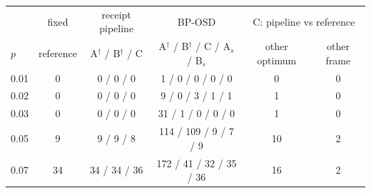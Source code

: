 \begin{tabular}{@{}lccccc@{}}
\toprule
 & fixed & receipt pipeline & BP-OSD & \multicolumn{2}{c}{C: pipeline vs reference} \\
$p$ & reference & A$^\dagger$ / B$^\dagger$ / C & A$^\dagger$ / B$^\dagger$ / C / A$_s$ / B$_s$ & other optimum & other frame \\
\midrule
0.01 & 0 & 0 / 0 / 0 & 1 / 0 / 0 / 0 / 0 & 0 & 0 \\
0.02 & 0 & 0 / 0 / 0 & 9 / 0 / 3 / 1 / 1 & 1 & 0 \\
0.03 & 0 & 0 / 0 / 0 & 31 / 1 / 0 / 0 / 0 & 1 & 0 \\
0.05 & 9 & 9 / 9 / 8 & 114 / 109 / 9 / 7 / 9 & 10 & 2 \\
0.07 & 34 & 34 / 34 / 36 & 172 / 41 / 32 / 35 / 36 & 16 & 2 \\
\bottomrule
\end{tabular}
